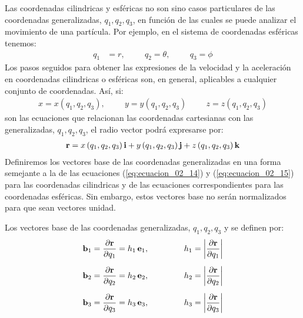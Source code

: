 Las coordenadas cilindricas y esféricas no son sino casos particulares de las coordenadas generalizadas, $q_{1}, q_{2}, q_{3}$, en función de las cuales se puede analizar el movimiento de una partícula. Por ejemplo, en el sistema de coordenadas esféricas tenemos:
\begin{align*}
q_{1} &= r, \hspace{1cm} q_{2} = \theta, \hspace{1cm} q_{3} = \phi
\end{align*}
Los pasos seguidos para obtener las expresiones de la velocidad y la aceleración en coordenadas cilindricas o esféricas son, en general, aplicables a cualquier conjunto de coordenadas. Así, si:
\begin{align}
    x = x \left( q_{1}, q_{2}, q_{3} \right), \hspace{1cm} y = y \left( q_{1}, q_{2}, q_{3} \right) \hspace{1cm} z = z \left( q_{1}, q_{2}, q_{3} \right)  \label{eq:ecuacion_02_53}
\end{align}
son las ecuaciones que relacionan las coordenadas cartesianas con las generalizadas, $q_{1}, q_{2}, q_{3}$, el radio vector podrá expresarse por:
\begin{align}
    \vb{r} = x \left( q_{1}, q_{2}, q_{3} \right) \vb{i} + y \left( q_{1}, q_{2}, q_{3} \right) \vb{j} +  z \left( q_{1}, q_{2}, q_{3} \right) \vb{k}
    \label{eq:ecuacion_02_54}
\end{align}
Definiremos los vectores base de las coordenadas generalizadas en una forma semejante a la de las ecuaciones (\ref{eq:ecuacion_02_14}) y (\ref{eq:ecuacion_02_15}) para las coordenadas cilindricas y de las ecuaciones correspondientes para las coordenadas esféricas. Sin embargo, estos vectores base no serán normalizados para que sean vectores unidad. 
\par
Los vectores base de las coordenadas generalizadas, $q_{1}, q_{2}, q_{3}$ y se definen por:
\begin{align}
    \vb{b}_{1} &= \pdv{\vb{r}}{q_{1}} = h_{1} \, \vb{e}_{1}, \hspace{1.5cm} h_{1} = \abs{\pdv{\vb{r}}{q_{1}}} \label{eq:ecuacion_02_55} \\[0.5em]
    \vb{b}_{2} &= \pdv{\vb{r}}{q_{2}} = h_{2} \, \vb{e}_{2}, \hspace{1.5cm} h_{2} = \abs{\pdv{\vb{r}}{q_{2}}} \label{eq:ecuacion_02_56} \\[0.5em]
    \vb{b}_{3} &= \pdv{\vb{r}}{q_{3}} = h_{3} \, \vb{e}_{3}, \hspace{1.5cm} h_{3} = \abs{\pdv{\vb{r}}{q_{3}}} \label{eq:ecuacion_02_57}
\end{align}
